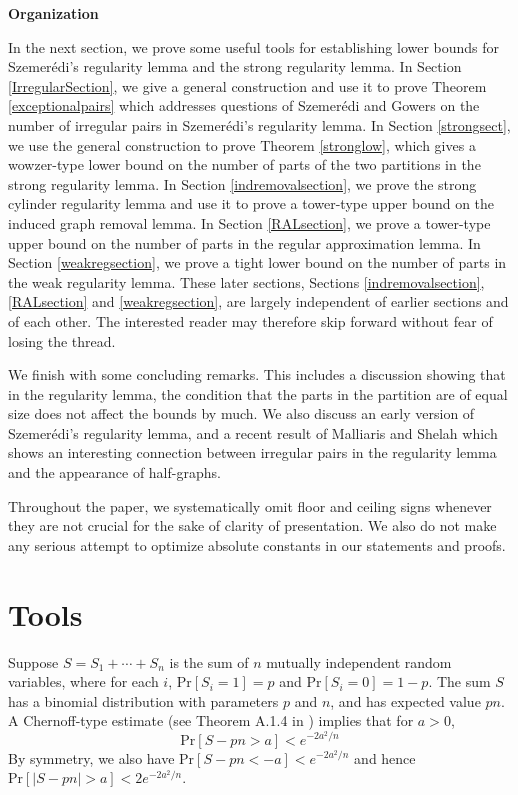 \documentclass[11pt]{article}
\begin{document}
\vspace{0.1cm}
{\bf Organization}

In the next section, we prove some useful tools for establishing lower bounds
for Szemer\'edi's regularity lemma and the strong regularity lemma. In Section
\ref{IrregularSection}, we give a general construction and use it to prove
Theorem \ref{exceptionalpairs} which addresses questions of Szemer\'edi and
Gowers on the number of irregular pairs in Szemer\'edi's regularity lemma. In
Section \ref{strongsect}, we use the general construction to prove Theorem
\ref{stronglow}, which gives a wowzer-type lower bound on the number of parts
of the two partitions in the strong regularity lemma. In Section
\ref{indremovalsection}, we prove the strong cylinder regularity lemma and use
it to prove a tower-type upper bound on the induced graph removal lemma. In
Section \ref{RALsection}, we prove a tower-type upper bound on the number of
parts in the regular approximation lemma. In Section \ref{weakregsection}, we
prove a tight lower bound on the number of parts in the weak regularity lemma.
These later sections, Sections \ref{indremovalsection}, \ref{RALsection} and \ref{weakregsection}, are largely independent of earlier sections and of each other. The interested reader may therefore skip forward without fear of losing the thread.

We finish with some concluding remarks. This includes a discussion showing that
in the regularity lemma, the condition that the parts in the partition are of
equal size does not affect the bounds by much. We also discuss an early version
of Szemer\'edi's regularity lemma, and a recent result of Malliaris and Shelah
which shows an interesting connection between irregular pairs in the regularity
lemma and the appearance of half-graphs. 

Throughout the paper, we systematically omit floor and ceiling signs whenever they are not crucial for the sake of clarity of presentation. We also do not make any serious attempt to
optimize absolute constants in our statements and proofs.


\section{Tools}

Suppose $S=S_1+\cdots+S_n$ is the sum of $n$ mutually independent random
variables, where for each $i$, $\textrm{Pr}[S_i=1]=p$ and
$\textrm{Pr}[S_i=0]=1-p$. The sum $S$ has a binomial distribution with
parameters $p$ and $n$, and has expected value $pn$. A Chernoff-type estimate
(see Theorem A.1.4 in \cite{AlSp}) implies that for $a>0$,
\begin{equation}\label{chernoffest} \textrm{Pr}[S-pn>a] < e^{-2a^2/n}
\end{equation}
By symmetry, we also have $\textrm{Pr}[S-pn<-a]<e^{-2a^2/n}$ and hence
$\textrm{Pr}[|S-pn|>a] < 2e^{-2a^2/n}$.
\end{document}
